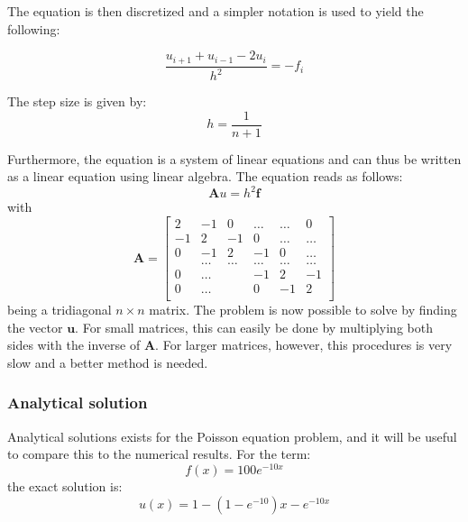\documentclass[12pt]{article}
\begin{document}
The equation is then discretized and a simpler notation is used to yield the following:

\begin{equation}
\frac{u_{i+1}+u_{i-1}-2u_{i}}{h^{2}}=-f_{i}
\end{equation}

The step size is given by:
\begin{equation}
h = \frac{1}{n+1}
\end{equation}

Furthermore, the equation is a system of linear equations and can thus be written as a linear equation using linear algebra. The equation reads as follows:
\begin{equation}
\mathbf{A}u=h^{2}\mathbf{f}
\end{equation}
with
\begin{equation}
\mathbf{A} = \begin{bmatrix}
                           2& -1& 0 &\dots   & \dots &0 \\
                           -1 & 2 & -1 &0 &\dots &\dots \\
                           0&-1 &2 & -1 & 0 & \dots \\
                           & \dots   & \dots &\dots   &\dots & \dots \\
                           0&\dots   &  &-1 &2& -1 \\
                           0&\dots    &  & 0  &-1 & 2 \\
                      \end{bmatrix}
                      \label{eq:tridiagm}
\end{equation}
being a tridiagonal  $n\times n$ matrix. The problem is now possible to solve by finding the vector $\mathbf{u}$. For small matrices, this can easily be done by multiplying both sides with the inverse of $\mathbf{A}$. For larger matrices, however, this procedures is very slow and a better method is needed. 

\subsubsection{Analytical solution}
Analytical solutions exists for the Poisson equation problem, and it will be useful to compare this to the numerical results. 
For the term:
\begin{equation}
f(x) = 100e^{-10x}
\end{equation}
the exact solution is:
\begin{equation}
u(x) = 1-(1-e^{-10})x-e^{-10x}
\end{equation}
\end{document}

